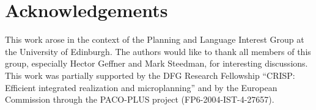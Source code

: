 \documentclass[letterpaper]{article}
\begin{document}
\section*{Acknowledgements}

This work arose in the context of the Planning and Language Interest Group
at the University of Edinburgh. The authors would like to thank all members
of this group, especially Hector Geffner and Mark Steedman, for interesting
discussions. This work was partially supported by the DFG Research
Fellowship ``CRISP: Efficient integrated realization and microplanning''
and by the European Commission through the PACO-PLUS project
(FP6-2004-IST-4-27657).





\pagebreak
\listoffigures
\end{document}
